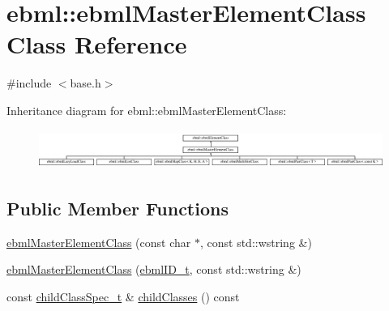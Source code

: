 \hypertarget{classebml_1_1ebmlMasterElementClass}{}\section{ebml\+:\+:ebml\+Master\+Element\+Class Class Reference}
\label{classebml_1_1ebmlMasterElementClass}


{\ttfamily \#include $<$base.\+h$>$}

Inheritance diagram for ebml\+:\+:ebml\+Master\+Element\+Class\+:\begin{figure}[H]
\begin{center}
\leavevmode
\includegraphics[height=1.278539cm]{classebml_1_1ebmlMasterElementClass}
\end{center}
\end{figure}
\subsection*{Public Member Functions}
\begin{DoxyCompactItemize}
\item 
\mbox{\hyperlink{classebml_1_1ebmlMasterElementClass_a46fb45335e35139c7f694ce9bc247d35}{ebml\+Master\+Element\+Class}} (const char $\ast$, const std\+::wstring \&)
\item 
\mbox{\hyperlink{classebml_1_1ebmlMasterElementClass_a1b455da9db4baed8bfeb2af3a1f7969b}{ebml\+Master\+Element\+Class}} (\mbox{\hyperlink{namespaceebml_a86c5f604ddf12a74aa9812e997a58691}{ebml\+I\+D\+\_\+t}}, const std\+::wstring \&)
\item 
const \mbox{\hyperlink{classebml_1_1childClassSpec__t}{child\+Class\+Spec\+\_\+t}} \& \mbox{\hyperlink{classebml_1_1ebmlMasterElementClass_ab3d49576f8ac2963fa5b996d692175ab}{child\+Classes}} () const
\end{DoxyCompactItemize}
